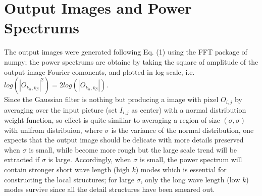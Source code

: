 \documentclass[a4paper,10pt]{article}
\begin{document}
\section*{Output Images and Power Spectrums}
\begin{large}
The output images were generated following Eq. (1) using the FFT package of numpy;  the power spectrums are obtaine by taking the square of amplitude of the output image Fourier comonents, and plotted in log scale, i.e. $log(\left |O_{k_\alpha,k_\beta}\right |^2)=2log(\left |O_{k_\alpha,k_\beta}\right |)$.\\

Since the Gaussian filter is nothing but producing a image with pixel $O_{i,j}$ by averaging over the input picture (set $I_{i,j}$ as center) with a normal distribution weight function, so effect is quite similiar to averaging a region of size $(\sigma,\sigma)$ with unifrom distribuion, where $\sigma$ is the variance of the normal distribution, one expects that the output image should be delicate with more details preserved when $\sigma$ is small, while become more rough but the large scale trend will be extracted if $\sigma$ is large. Accordingly, when $\sigma$ is small, the power spectrum will contain stronger short wave length (high $k$) modes which is essential for constructing the local structures; for large $\sigma$, only the long wave length (low $k$) modes survive since all the detail structures have been smeared out.
\begin{figure}[htbp] %
\centering %

\end{figure}
\end{large}
\end{document}
